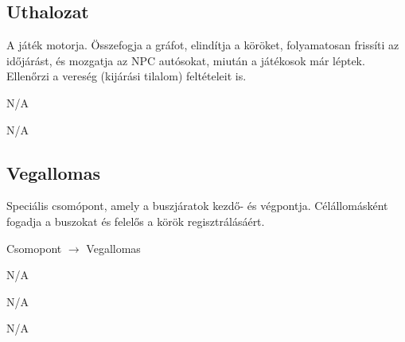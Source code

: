 \subsection{Uthalozat}
\begin{class-template-responsibility}
    A játék motorja. Összefogja a gráfot, elindítja a köröket, folyamatosan frissíti az időjárást, és mozgatja az NPC autósokat, miután a játékosok már léptek. Ellenőrzi a vereség (kijárási tilalom) feltételeit is.
\end{class-template-responsibility}
\begin{class-template-baseclass}
    N/A
\end{class-template-baseclass}
\begin{class-template-interface}
    N/A
    \end{class-template-interface}
\begin{class-template-attribute}
\end{class-template-attribute}
\begin{class-template-method}
\end{class-template-method}

\subsection{Vegallomas}
\begin{class-template-responsibility}
   Speciális csomópont, amely a buszjáratok kezdő- és végpontja. Célállomásként fogadja a buszokat és felelős a körök regisztrálásáért.
\end{class-template-responsibility}
\begin{class-template-baseclass}
    Csomopont $\rightarrow$ Vegallomas
\end{class-template-baseclass}
\begin{class-template-interface}
    N/A
\end{class-template-interface}
\begin{class-template-attribute}
    N/A
\end{class-template-attribute}
\begin{class-template-method}
    N/A
\end{class-template-method}

